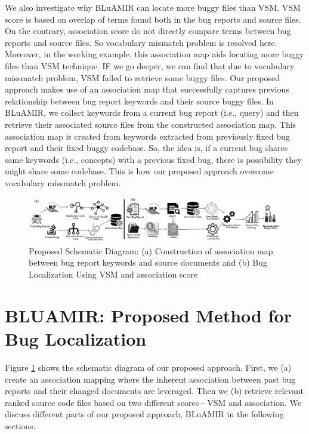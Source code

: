 \documentclass[conference]{IEEEtran}
\begin{document}
We also investigate why BLuAMIR can locate more buggy files than VSM.  
VSM score is based on overlap of terms found both in the bug reports and source files. On the contrary, association score do not directly compare terms between bug reports and source files. So vocabulary mismatch problem is resolved here. Moreover, in the working example, this association map aids locating more buggy files than VSM technique. IF we go deeper, we can find that due to vocabulary missmatch problem, VSM failed to retrieve some buggy files. Our proposed approach makes use of an association map that successfully captures previous relationship between bug report keywords and their source buggy files. 
In BLuAMIR, we collect keywords from a current bug report (i.e., query) and then retrieve their associated source files from the constructed association map. 
This association map is created from keywords extracted from previously fixed bug report and their fixed buggy codebase. So, the idea is, if a current bug shares same keywords (i.e., concepts) with a previous fixed bug, there is possibility they might share some codebase. This is how our proposed approach overcome vocabulary missmatch problem.

\begin{figure}
	\centering
	\includegraphics[scale=0.60]{SD6-Gray}
	\caption{Proposed Schematic Diagram: (a) Construction of association map between bug report keywords and source documents and (b) Bug Localization Using VSM and association score}
	\label{fig:systemDiagram}
\end{figure}
\section{BLUAMIR: Proposed Method for Bug Localization} \label{sec:proposedmethod} 
Figure \ref{fig:systemDiagram} shows the schematic diagram of our proposed approach.
First, we (a) create an association mapping where the inherent association between past bug reports and their changed documents are leveraged.
Then we (b) retrieve relevant ranked source code files based on two different scores - VSM and association.  
We discuss different parts of our proposed approach, BLuAMIR in the following sections.
\end{document}

